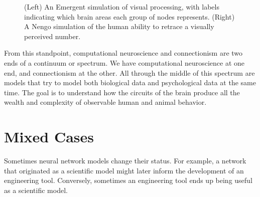 \begin{figure}[h]
\centering
{}
\hspace*{.4in}
\caption[Left: From ; Right: Spaun screenshot. Cf. \cite{eliasmith2012large}.]{(Left) An Emergent simulation of visual processing, with labels indicating which brain areas each group of nodes represents. (Right) A Nengo simulation of the human ability to retrace a visually perceived number.}
\label{ccnFigure}
\end{figure}

From this standpoint, computational neuroscience and connectionism are two ends of a continuum or spectrum. We have computational neuroscience at one end, and connectionism at the other. All through the middle of this spectrum are models that try to model both biological data and psychological data at the same time. The goal is to understand how the circuits of the brain produce all the wealth and complexity of observable human and animal behavior. 

\section{Mixed Cases}
\label{mixedCases}

Sometimes neural network models change their status. For example, a network that originated as a scientific model might later inform the development of an engineering tool. Conversely, sometimes an engineering tool ends up being useful as a scientific model. 
 
